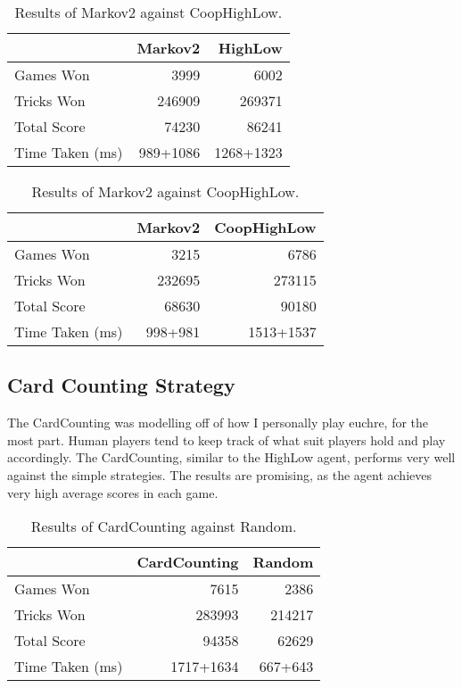 \begin{table}[ht]
    \begin{minipage}{.5\linewidth}
        \centering
        \begin{tabular}{l|rr}
            ~               &   Markov2 &   HighLow  \\  \hline
            Games Won       &   3999        &   6002   \\
            Tricks Won      &   246909      &   269371 \\
            Total Score     &   74230       &   86241  \\
            Time Taken (ms) &   989+1086   &   1268+1323
        \end{tabular}
        \caption{Results of Markov2 against HighLow.}
        \label{tab:markov2_highlow}
    \end{minipage}%
    \begin{minipage}{.5\linewidth}
        \centering
        \begin{tabular}{l|rr}
            ~               &   Markov2 &   CoopHighLow  \\  \hline
            Games Won       &   3215        &   6786   \\
            Tricks Won      &   232695      &   273115 \\
            Total Score     &   68630       &   90180  \\
            Time Taken (ms) &   998+981   &   1513+1537
        \end{tabular}
        \caption{Results of Markov2 against CoopHighLow.}
        \label{tab:markov2_coophighlow}
    \end{minipage} 
\end{table}


\subsection{Card Counting Strategy}

The CardCounting was modelling off of how I personally play euchre, for the most part. Human players tend to keep track of what suit
players hold and play accordingly. The CardCounting, similar to the HighLow agent, performs very well against the simple strategies.
The results are promising, as the agent achieves very high average scores in each game.

\begin{table}[ht]
    \centering
    \begin{tabular}{l|rr}
        ~               &  CardCounting &   Random  \\  \hline
        Games Won       &   7615        &   2386   \\
        Tricks Won      &   283993      &   214217 \\
        Total Score     &   94358       &   62629  \\
        Time Taken (ms) &   1717+1634   &   667+643
    \end{tabular}
    \caption{Results of CardCounting against Random.}
    \label{tab:cardcounting_random}
\end{table}

